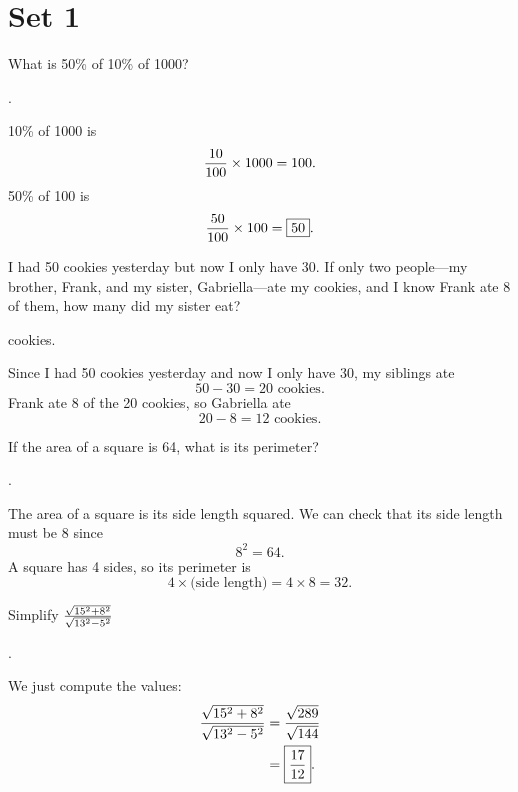 \documentclass[11pt]{article}
\DeclareRobustCommand{\frac}[3][0pt]{%
  {\begingroup\hspace{#1}#2\hspace{#1}\endgroup\over\hspace{#1}#3\hspace{#1}}}
\begin{document}


\section*{Set 1}

\begin{problem}
What is 50\% of 10\% of 1000?
\end{problem}
\begin{answer}
.
\end{answer}
\begin{solution}
10\% of 1000 is
$$\frac{10}{100} \times 1000 = 100.$$
50\% of 100 is
$$\frac{50}{100} \times 100 = \boxed{50}.$$
\end{solution}

\begin{problem}
I had 50 cookies yesterday but now I only have 30. If only two people—my brother, Frank, and my sister, Gabriella—ate my cookies, and I know Frank ate 8 of them, how many did my sister eat?
\end{problem}
\begin{answer}
 cookies.
\end{answer}
\begin{solution}
Since I had 50 cookies yesterday and now I only have 30, my siblings ate
$$50-30 = 20 \text{ cookies}.$$
Frank ate 8 of the 20 cookies, so Gabriella ate
$$20-8=\boxed{12} \text{ cookies}.$$
\end{solution}

\begin{problem}
If the area of a square is 64, what is its perimeter?
\end{problem}
\begin{answer}
.
\end{answer}
\begin{solution}
The area of a square is its side length squared. We can check that its side length must be 8 since
$$8^2 = 64.$$
A square has 4 sides, so its perimeter is
$$4 \times \text{(side length)} = 4 \times 8 = \boxed{32}.$$
\end{solution}


\begin{problem}
Simplify $\frac{\sqrt{15^2+8^2}}{\sqrt{13^2-5^2}}$
\end{problem}
\begin{answer}
 \boxed{\frac{17}{12}}.
\end{answer}
\begin{solution}
We just compute the values:
\begin{align*}
\frac{\sqrt{15^2+8^2}}{\sqrt{13^2-5^2}} &= \frac{\sqrt{289}}{\sqrt{144}} \\
                    	&= \boxed{\frac{17}{12}}.
\end{align*}
\end{solution}
\end{document}
